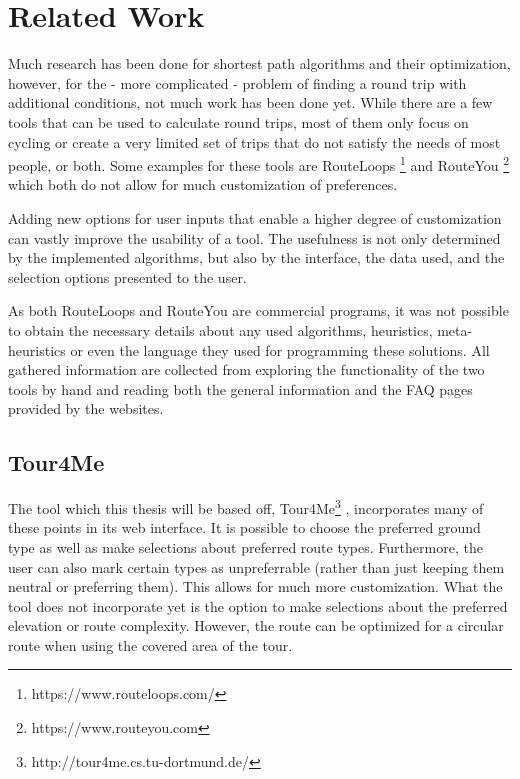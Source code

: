 \chapter{Related Work}
\label{chapter:relatedWork}


Much research has been done for shortest path algorithms and their optimization, however, for the - more complicated \cite{gemsaEfficientComputationJogging2013} - problem of finding a round trip with additional conditions, not much work has been done yet.
While there are a few tools that can be used to calculate round trips, most of them only focus on cycling or create a very limited set of trips that do not satisfy the needs of most people, or both. 
Some examples for these tools are RouteLoops \footnote{https://www.routeloops.com/} and RouteYou \footnote{https://www.routeyou.com} which both do not allow for much customization of preferences. 

Adding new options for user inputs that enable a higher degree of customization can vastly improve the usability of a tool. 
The usefulness is not only determined by the implemented algorithms, but also by the interface, the data used, and the selection options presented to the user. 

As both RouteLoops and RouteYou are commercial programs, it was not possible to obtain the necessary details about any used algorithms, heuristics, meta-heuristics or even the language they used for programming these solutions.
All gathered information are collected from exploring the functionality of the two tools by hand and reading both the general information and the FAQ pages provided by the websites. 

\section{Tour4Me}
\label{sec:Tour4Me}

The tool which this thesis will be based off, Tour4Me\footnote{http://tour4me.cs.tu-dortmund.de/} \cite{buchinTour4MeFrameworkCustomized2022a}, incorporates many of these points in its web interface. 
It is possible to choose the preferred ground type as well as make selections about preferred route types.
Furthermore, the user can also mark certain types as unpreferrable (rather than just keeping them neutral or preferring them).
This allows for much more customization.
What the tool does not incorporate yet is the option to make selections about the preferred elevation or route complexity.
However, the route can be optimized for a circular route when using the covered area of the tour. 

